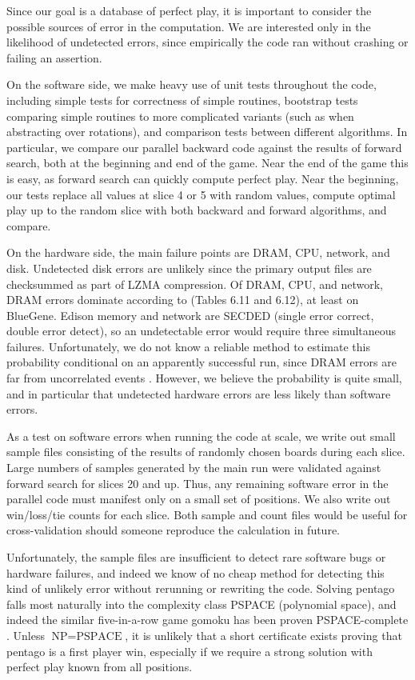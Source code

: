 \documentclass[conference]{IEEEtran}
\begin{document}
Since our goal is a database of perfect play, it is important to consider the possible sources of error in the
computation.  We are interested only in the likelihood of undetected errors, since empirically the code ran
without crashing or failing an assertion.

On the software side, we make heavy use of unit tests throughout the code, including simple tests
for correctness of simple routines, bootstrap tests comparing simple routines to more complicated variants
(such as when abstracting over rotations), and comparison tests between different algorithms.
In particular, we compare our parallel backward code against the results of forward search, both at the
beginning and end of the game.  Near the end of the game this is easy, as forward search can quickly compute
perfect play.  Near the beginning, our tests replace all values at slice 4 or 5 with random values,
compute optimal play up to the random slice with both backward and forward algorithms, and compare.

On the hardware side, the main failure points are DRAM, CPU, network, and disk.  Undetected disk errors are unlikely
since the primary output files are checksummed as part of LZMA compression.  Of DRAM, CPU, and network, DRAM errors
dominate according to \cite{bergman2008exascale} (Tables 6.11 and 6.12), at least on BlueGene.  Edison memory
and network are SECDED (single error correct, double error detect), so an undetectable error would require three
simultaneous failures.  Unfortunately, we do not know a reliable method to estimate this probability conditional
on an apparently successful run, since DRAM errors are far from uncorrelated events \cite{schroeder2009dram}.
However, we believe the probability is quite small, and in particular that undetected hardware errors are less
likely than software errors.

As a test on software errors when running the code at scale, we write out small sample files consisting of the
results of randomly chosen boards during each slice.  Large numbers of samples generated by the main run were
validated against forward search for slices 20 and up.  Thus, any remaining software error in the parallel code
must manifest only on a small set of positions.  We also write out win/loss/tie counts for each slice.
Both sample and count files would be useful for cross-validation should someone reproduce the calculation
in future.

Unfortunately, the sample files are insufficient to detect rare software bugs or hardware failures, and indeed
we know of no cheap method for detecting this kind of unlikely error without rerunning or rewriting the code.
Solving pentago falls most naturally into the complexity class PSPACE (polynomial space), and indeed the similar
five-in-a-row game gomoku has been proven PSPACE-complete \cite{reisch1980gobang}.  Unless
$\textrm{NP}=\textrm{PSPACE}$, it is unlikely that a short certificate exists proving that pentago is
a first player win, especially if we require a strong solution with perfect play known from all positions.
\end{document}
